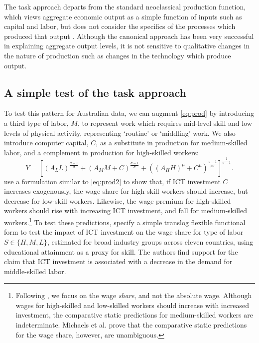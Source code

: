 The task approach departs from the standard neoclassical production function, which views aggregate economic output as a simple function of inputs such as capital and labor, but does not consider the specifics of the processes which produced that output \citep{Acemoglu2011}. Although the canonical approach has been very successful in explaining aggregate output levels, it is not sensitive to qualitative changes in the nature of production such as changes in the technology which produce output. 

\subsection{A simple test of the task approach}

To test this pattern for Australian data, we can augment \eqref{eq:prod} by introducing a third type of labor, $M$, to represent work which requires mid-level skill and low levels of physical activity, representing `routine' or `middling' work. We also introduce computer capital, $C$, as a substitute in production for medium-skilled labor, and a complement in production for high-skilled workers:
\begin{equation}  \label{eq:prod2}
Y = \left[
  \left(A_LL \right)^\frac{\sigma-1}{\sigma}
  +
  \left(A_MM + C\right)^\frac{\sigma-1}{\sigma}
  +
  \left((A_HH)^\mu + C^\mu\right)^\frac{\sigma-1}{\mu\sigma}
  \right]^\frac{1}{\sigma-1}.
\end{equation}
\citet{Michaels2010} use a formulation similar to \eqref{eq:prod2} to show that, if ICT investment $C$ increases exogenously, the wage share for high-skill workers should increase, but decrease for low-skill workers. Likewise, the wage premium for high-skilled workers should rise with increasing ICT investment, and fall for medium-skilled workers.\footnote{Following \citet{Michaels2010}, we focus on the wage {\em share}, and not the absolute wage. Although wages for high-skilled and low-skilled workers should increase with increased investment, the comparative static predictions for medium-skilled workers are indeterminate. Michaels et al. prove that the comparative static predictions for the wage share, however, are unambiguous.} To test these predictions, \citet{Michaels2010} specify a simple translog flexible functional form to test the impact of ICT investment on the wage share for type of labor $S\in\{H,M,L\}$, estimated for broad industry groups across eleven countries, using educational attainment as a proxy for skill. The authors find support for the claim that ICT investment is associated with a decrease in the demand for middle-skilled labor. 

